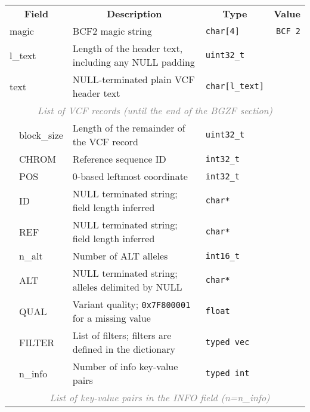 \documentclass[10pt]{article}
\begin{document}
\begin{table}[ht]
\centering
{\small
\begin{tabular}{|l|l|l|p{8.2cm}|l|r|}
  \cline{1-6}
  \multicolumn{3}{|c|}{\bf Field} & \multicolumn{1}{c|}{\bf Description} & \multicolumn{1}{c|}{\bf Type} & \multicolumn{1}{c|}{\bf Value} \\\cline{1-6}
  \multicolumn{3}{|l|}{\sf magic} & BCF2 magic string & {\tt char[4]} & {\tt BCF\char92 2}\\\cline{1-6}
  \multicolumn{3}{|l|}{\sf l\_text} & Length of the header text, including any {\sf NULL} padding & {\tt uint32\_t} & \\\cline{1-6}
  \multicolumn{3}{|l|}{\sf text} & {\sf NULL}-terminated plain VCF header text & {\tt char[{\sf l\_text}]} & \\\cline{1-6}
  \multicolumn{6}{|c|}{\textcolor{gray}{\it List of VCF records (until the end of the BGZF section)}} \\\cline{2-6}
  & \multicolumn{2}{l|}{\sf block\_size} & Length of the remainder of the VCF record & {\tt uint32\_t} & \\\cline{2-6}
  & \multicolumn{2}{l|}{\sf CHROM} & Reference sequence ID & {\tt int32\_t} & \\\cline{2-6}
  & \multicolumn{2}{l|}{\sf POS} & 0-based leftmost coordinate & {\tt int32\_t} & \\\cline{2-6}
  & \multicolumn{2}{l|}{\sf ID} & {\sf NULL} terminated string; field length inferred & {\tt char*} & \\\cline{2-6}
  & \multicolumn{2}{l|}{\sf REF} & {\sf NULL} terminated string; field length inferred & {\tt char*} & \\\cline{2-6}
  & \multicolumn{2}{l|}{\sf n\_alt} & Number of {\sf ALT} alleles & {\tt int16\_t} & \\\cline{2-6}
  & \multicolumn{2}{l|}{\sf ALT} & {\sf NULL} terminated string; alleles delimited by {\sf NULL} & {\tt char*} & \\\cline{2-6}
  & \multicolumn{2}{l|}{\sf QUAL} & Variant quality; {\tt 0x7F800001} for a missing value & {\tt float} & \\\cline{2-6}
  & \multicolumn{2}{l|}{\sf FILTER} & List of filters; filters are defined in the dictionary & {\tt typed vec} & \\\cline{2-6}
  & \multicolumn{2}{l|}{\sf n\_info} & Number of info key-value pairs & {\tt typed int} & \\\cline{2-6}
  & \multicolumn{5}{c|}{\textcolor{gray}{\it List of key-value pairs in the INFO field (n=n\_info)}} \\\cline{3-6}

\end{tabular}}
\end{table}
\end{document}
